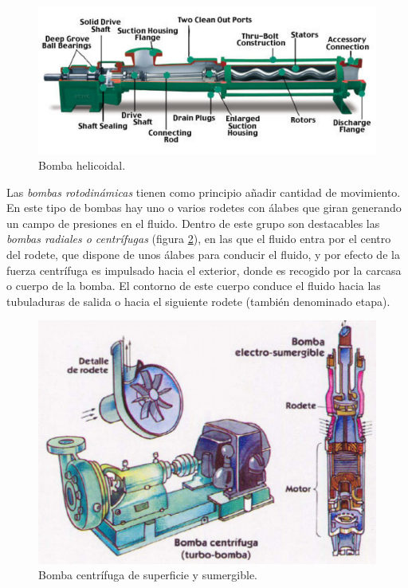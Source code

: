 %
\begin{figure}
\begin{centering}
\includegraphics[scale=0.9]{../figs/bombatornillo}
\end{centering}

\caption{Bomba helicoidal.\label{fig:Bomba-helicoidal}}

\end{figure}


Las \emph{bombas rotodinámicas} tienen como principio añadir cantidad
de movimiento. En este tipo de bombas hay uno o varios rodetes con
álabes que giran generando un campo de presiones en el fluido. Dentro
de este grupo son destacables las \emph{bombas radiales o centrífugas}
(figura \ref{fig:Bomba-centr=0000EDfuga}), en las que el fluido entra
por el centro del rodete, que dispone de unos álabes para conducir
el fluido, y por efecto de la fuerza centrífuga es impulsado hacia
el exterior, donde es recogido por la carcasa o cuerpo de la bomba.
El contorno de este cuerpo conduce el fluido hacia las tubuladuras
de salida o hacia el siguiente rodete (también denominado etapa). 

%
\begin{figure}
\begin{centering}
\includegraphics[scale=0.5]{../figs/BombaCentrifuga}
\end{centering}

\caption{Bomba centrífuga de superficie y sumergible.\label{fig:Bomba-centr=0000EDfuga}}

\end{figure}


